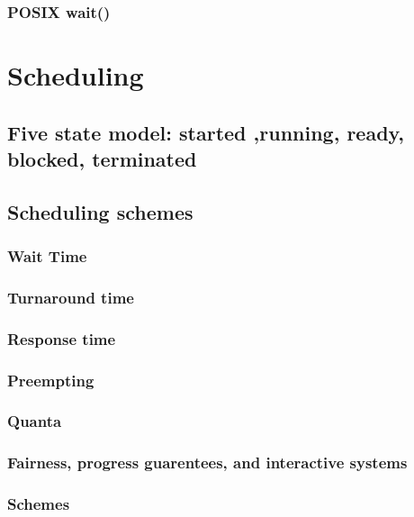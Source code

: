 \documentclass[11pt]{article}
\begin{document}
\subsubsection{POSIX wait()}
\label{sec-6.4.3}

\section{Scheduling}
\label{sec-7}

\subsection{Five state model: started ,running, ready, blocked, terminated}
\label{sec-7.1}

\subsection{Scheduling schemes}
\label{sec-7.2}

\subsubsection{Wait Time}
\label{sec-7.2.1}

\subsubsection{Turnaround time}
\label{sec-7.2.2}

\subsubsection{Response time}
\label{sec-7.2.3}

\subsubsection{Preempting}
\label{sec-7.2.4}

\subsubsection{Quanta}
\label{sec-7.2.5}

\subsubsection{Fairness, progress guarentees, and interactive systems}
\label{sec-7.2.6}

\subsubsection{Schemes}
\label{sec-7.2.7}
\end{document}
